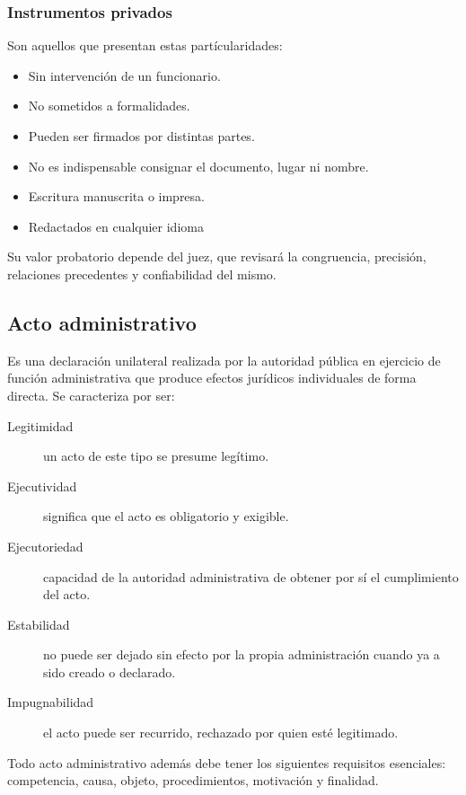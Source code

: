 \documentclass[../resumen.tex]{subfiles}
\begin{document}
\subsubsection{Instrumentos privados}

Son aquellos que presentan estas partícularidades:
\begin{itemize}
  \item Sin intervención de un funcionario.
  \item No sometidos a formalidades.
  \item Pueden ser firmados por distintas partes.
  \item No es indispensable consignar el documento, lugar ni nombre.
  \item Escritura manuscrita o impresa.
  \item Redactados en cualquier idioma
\end{itemize}

Su valor probatorio depende del juez, que revisará la congruencia, precisión,
relaciones precedentes y confiabilidad del mismo.

\subsection{Acto administrativo}

Es una declaración unilateral realizada por la autoridad pública en ejercicio
de función administrativa que produce efectos jurídicos individuales de 
forma directa. Se caracteriza por ser:

\begin{description}
  \item[Legitimidad] un acto de este tipo se presume legítimo.
  \item[Ejecutividad] significa que el acto es obligatorio y exigible.
  \item[Ejecutoriedad] capacidad de la autoridad administrativa de obtener por sí
    el cumplimiento del acto.
  \item[Estabilidad] no puede ser dejado sin efecto por la propia administración
    cuando ya a sido creado o declarado.
  \item[Impugnabilidad] el acto puede ser recurrido, rechazado por quien esté 
    legitimado.
\end{description}

Todo acto administrativo además debe tener los siguientes requisitos esenciales:
competencia, causa, objeto, procedimientos, motivación y finalidad.
\end{document}
